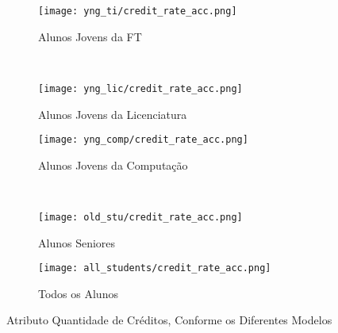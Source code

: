 \clearpage
\begin{figure}[!ht]
    \centering
    \begin{subfigure}[b]{0.48\textwidth}
        \centering
        \texttt{[image: yng\_ti/credit\_rate\_acc.png]}
        \caption{Alunos Jovens da FT}
    \end{subfigure}
    ~
    \begin{subfigure}[b]{0.48\textwidth}
        \centering
        \texttt{[image: yng\_lic/credit\_rate\_acc.png]}
        \caption{Alunos Jovens da Licenciatura}
    \end{subfigure}

    \begin{subfigure}[b]{0.48\textwidth}
        \centering
        \texttt{[image: yng\_comp/credit\_rate\_acc.png]}
        \caption{Alunos Jovens da Computação}
    \end{subfigure}
    ~
    \begin{subfigure}[b]{0.48\textwidth}
        \centering
        \texttt{[image: old\_stu/credit\_rate\_acc.png]}
        \caption{Alunos Seniores}
    \end{subfigure}

    \begin{subfigure}[b]{0.48\textwidth}
        \centering
        \texttt{[image: all\_students/credit\_rate\_acc.png]}
        \caption{Todos os Alunos}
    \end{subfigure}
    \caption{Atributo Quantidade de Créditos, Conforme os Diferentes Modelos}
\end{figure}

